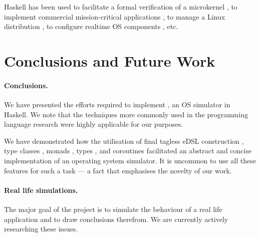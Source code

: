 Haskell has been used to facilitate a formal verification of a
microkernel \cite{Klein:2009:ERS:1631687.1596566}, to implement
commercial mission-critical applications
\cite{Sampson:2009:ERH:1631687.1596578}, to manage a Linux
distribution \cite{Beshers:2007:ERU:1291220.1291184}, to configure
realtime OS components \cite{Jones:2008:ERP:1411203.1411219}, etc.

\section{Conclusions and Future Work}
\label{sec:concl-future-work}

\paragraph{Conclusions.}
We have presented the efforts required to implement \soosim, an OS simulator in Haskell.
We note that the techniques more commonly used in the programming language research were highly applicable for our purposes.

We have demonstrated how the utilisation of final tagless eDSL construction \cite{final_tagless_embedding,Hofer:2008:PED:1449913.1449935}, type classes \cite{Hall:1996:TCH:227699.227700}, monads \cite{Wadler:1990:CM:91556.91592},  types \cite{Abadi:1991:DTS:103135.103138}, and coroutines \cite{coroutines,cmt} facilitated an abstract and concise implementation of an operating system simulator.
It is uncommon to use all these features for such a task --- a fact that emphasises the novelty of our work.

\paragraph{Real life simulations.}
The major goal of the project is to simulate the behaviour of a real life application and to draw conclusions therefrom.
We are currently actively researching these issues.

